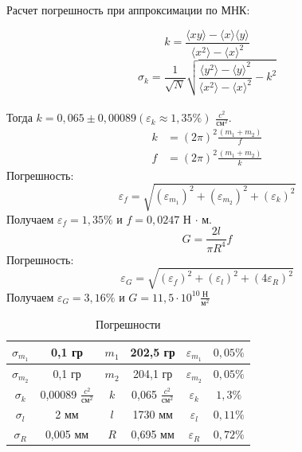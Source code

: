 \documentclass[a4paper]{article}
\begin{document}
Расчет погрешность при аппроксимации по МНК:

\[k=\frac{\langle xy\rangle-\langle x\rangle \langle y\rangle}{\langle x^2\rangle - \langle x\rangle^2}\]
\[\sigma_{k} = \frac{1}{\sqrt{N}}\sqrt{\frac{\langle y^2 \rangle - \langle y \rangle ^2}{\langle x^2 \rangle - \langle x \rangle ^2} - k^2}\]\\
Тогда $k = 0,065 \pm  0,00089 (\varepsilon_{k} \approx 1,35\%)$ $\frac{c^2}{\text{см}^2}$.\\
\begin{align}
    k &= (2\pi)^2\frac{(m_{1}+m_{2})}{f}\\
    f &= (2\pi)^2\frac{(m_{1}+m_{2})}{k}
\end{align}
Погрешность:
\[
    \varepsilon_{f} = \sqrt{(\varepsilon_{m_{1}})^2 + (\varepsilon_{m_{2}})^2 + (\varepsilon_{k})^2} 
\]
Получаем $\varepsilon_{f} = 1,35\%$ и $f = 0,0247$ Н $\cdot$ м.\\
\[
    G=\frac{2l}{\pi R^{4}}f
\]
Погрешность:
\[
    \varepsilon_{G} = \sqrt{(\varepsilon_{f})^2 + (\varepsilon_{l})^2 + (4\varepsilon_{R})^2} 
\]
Получаем $\varepsilon_{G} = 3,16\%$ и $G = 11,5 \cdot 10^{10} \frac{\text{Н}}{\text{м}^2}$ 

\begin{table}[h!]
\begin{center}
\begin{tabular}{|c|c|c|c|c|c|}
\hline
$\sigma_{m_{1}}$ & 0,1 гр & $m_{1}$ & 202,5 гр    & $\varepsilon_{m_{1}}$ & $0,05\%$ \\ \hline
$\sigma_{m_{2}}$ & 0,1 гр   & $m_{2}$ & 204,1 гр    & $\varepsilon_{m_{2}}$ & $0,05\%$  \\ \hline
$\sigma_{k}$ & 0,00089 $\frac{c^2}{\text{см}^2}$ & $k$ & 0,065 $\frac{c^2}{\text{см}^2}$ & $\varepsilon_{k}$ & $1,3\%$ \\ \hline
$\sigma_{l}$ & 2 мм   & $l$ & 1730 мм    & $\varepsilon_{l}$ & $0,11\%$  \\ \hline
$\sigma_{R}$ & 0,005 мм   & $R$ & 0,695 мм    & $\varepsilon_{R}$ & $0,72\%$  \\ \hline
\end{tabular}
\caption{Погрешности}
\end{center}
\end{table}
\end{document}
